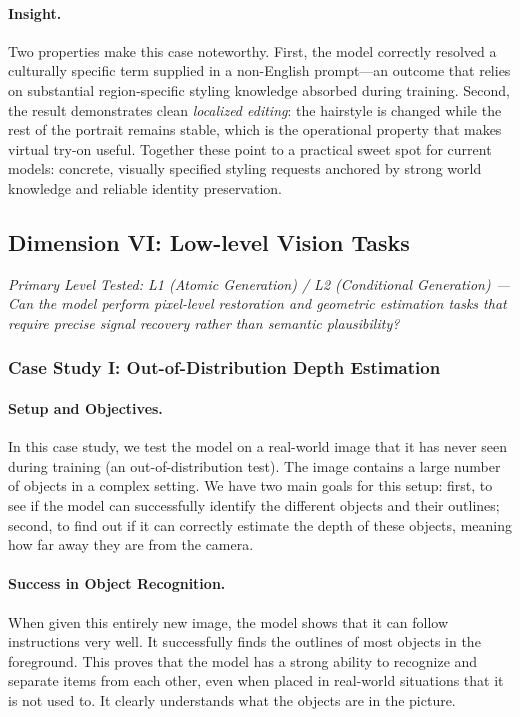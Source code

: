 \documentclass{llmxive}
\begin{document}
\paragraph{Insight.}
Two properties make this case noteworthy. First, the model correctly resolved a culturally specific term supplied in a non-English prompt---an outcome that relies on substantial region-specific styling knowledge absorbed during training. Second, the result demonstrates clean \emph{localized editing}: the hairstyle is changed while the rest of the portrait remains stable, which is the operational property that makes virtual try-on useful. Together these point to a practical sweet spot for current models: concrete, visually specified styling requests anchored by strong world knowledge and reliable identity preservation.

\subsection{Dimension VI: Low-level Vision Tasks}

\noindent\textit{Primary Level Tested: L1 (Atomic Generation) / L2 (Conditional Generation) --- Can the model perform pixel-level restoration and geometric estimation tasks that require precise signal recovery rather than semantic plausibility?}
\subsubsection{Case Study I: Out-of-Distribution Depth Estimation}
\paragraph{Setup and Objectives.} 
In this case study, we test the model on a real-world image that it has never seen during training (an out-of-distribution test). The image contains a large number of objects in a complex setting. We have two main goals for this setup: first, to see if the model can successfully identify the different objects and their outlines; second, to find out if it can correctly estimate the depth of these objects, meaning how far away they are from the camera.

\paragraph{Success in Object Recognition.} 
When given this entirely new image, the model shows that it can follow instructions very well. It successfully finds the outlines of most objects in the foreground. This proves that the model has a strong ability to recognize and separate items from each other, even when placed in real-world situations that it is not used to. It clearly understands what the objects are in the picture.
\end{document}
